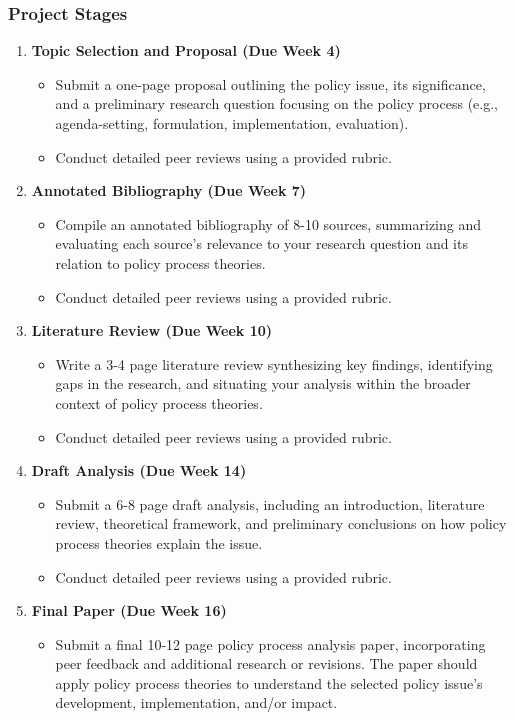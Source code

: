 \documentclass[11pt, letterpaper]{article}
\begin{document}
\subsubsection*{Project Stages}
\begin{enumerate}
    \item \textbf{Topic Selection and Proposal (Due Week 4)}
    \begin{itemize}
        \item Submit a one-page proposal outlining the policy issue, its significance, and a preliminary research question focusing on the policy process (e.g., agenda-setting, formulation, implementation, evaluation).
        \item Conduct detailed peer reviews using a provided rubric.
    \end{itemize}
    \item \textbf{Annotated Bibliography (Due Week 7)}
    \begin{itemize}
        \item Compile an annotated bibliography of 8-10 sources, summarizing and evaluating each source's relevance to your research question and its relation to policy process theories.
        \item Conduct detailed peer reviews using a provided rubric.
    \end{itemize}
    \item \textbf{Literature Review (Due Week 10)}
    \begin{itemize}
        \item Write a 3-4 page literature review synthesizing key findings, identifying gaps in the research, and situating your analysis within the broader context of policy process theories.
        \item Conduct detailed peer reviews using a provided rubric.
    \end{itemize}
    \item \textbf{Draft Analysis (Due Week 14)}
    \begin{itemize}
        \item Submit a 6-8 page draft analysis, including an introduction, literature review, theoretical framework, and preliminary conclusions on how policy process theories explain the issue.
        \item Conduct detailed peer reviews using a provided rubric.
    \end{itemize}
    \item \textbf{Final Paper (Due Week 16)}
    \begin{itemize}
        \item Submit a final 10-12 page policy process analysis paper, incorporating peer feedback and additional research or revisions. The paper should apply policy process theories to understand the selected policy issue's development, implementation, and/or impact.
    \end{itemize}
\end{enumerate}
\end{document}
